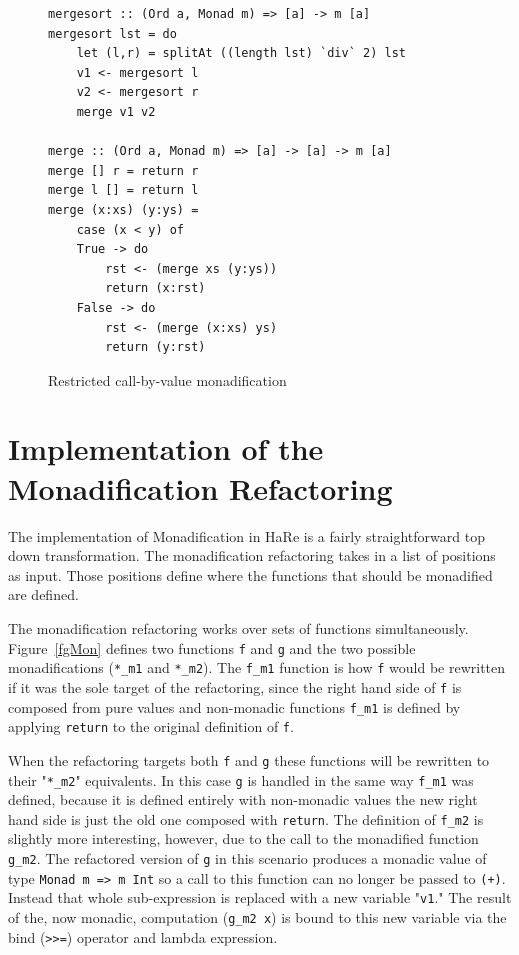 \begin{figure}[t]
\begin{lstlisting}
mergesort :: (Ord a, Monad m) => [a] -> m [a]
mergesort lst = do
	let (l,r) = splitAt ((length lst) `div` 2) lst
	v1 <- mergesort l
	v2 <- mergesort r
	merge v1 v2
	
merge :: (Ord a, Monad m) => [a] -> [a] -> m [a]
merge [] r = return r
merge l [] = return l
merge (x:xs) (y:ys) = 
	case (x < y) of
	True -> do 
		rst <- (merge xs (y:ys)) 
		return (x:rst)
	False -> do
		rst <- (merge (x:xs) ys)	
	 	return (y:rst)
\end{lstlisting}
\caption{Restricted call-by-value monadification}
\label{rCBV}
\end{figure}

\section{Implementation of the Monadification Refactoring}
\label{monadImp}

The implementation of Monadification in HaRe is a fairly straightforward top down transformation. The monadification refactoring takes in a list of positions as input. Those positions define where the functions that should be monadified are defined. 

The monadification refactoring works over sets of functions simultaneously. Figure~\ref{fgMon} defines two functions \texttt{f} and \texttt{g} and the two possible monadifications (\texttt{*\_m1} and \texttt{*\_m2}). The \texttt{f\_m1} function is how \texttt{f} would be rewritten if it was the sole target of the refactoring, since the right hand side of \texttt{f} is composed from pure values and non-monadic functions \texttt{f\_m1} is defined by applying \texttt{return} to the original definition of \texttt{f}.

When the refactoring targets both \texttt{f} and \texttt{g} these functions will be rewritten to their "\texttt{*\_m2}" equivalents. In this case \texttt{g} is handled in the same way \texttt{f\_m1} was defined, because it is defined entirely with non-monadic values the new right hand side is just the old one composed with \texttt{return}. The definition of \texttt{f\_m2} is slightly more interesting, however, due to the call to the monadified function \texttt{g\_m2}. The refactored version of \texttt{g} in this scenario produces a monadic value of type \texttt{Monad m => m Int} so a call to this function can no longer be passed to \texttt{(+)}. Instead that whole sub-expression is replaced with a new variable "\texttt{v1}." The result of the, now monadic, computation (\texttt{g\_m2 x}) is bound to this new variable via the bind (\texttt{>>=}) operator and lambda expression. 

